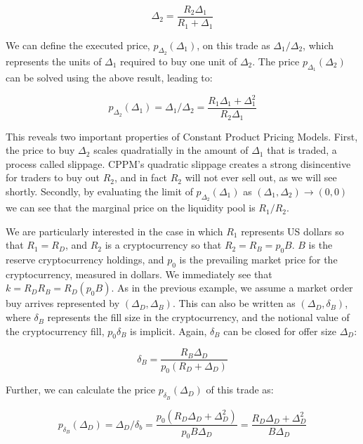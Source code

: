 \documentclass{article}
\begin{document}
\begin{equation}
\label{eq:cspm_sol}
\Delta_2 = \frac{R_2 \Delta_1}{R_1 + \Delta_1}
\end{equation}

We can define the executed price, $p_{\Delta_2}(\Delta_1)$, on this trade as $\Delta_1 / \Delta_2$, which represents the units of $\Delta_1$ required to buy one unit of $\Delta_2$. The price $p_{\Delta_1}(\Delta_2)$ can be solved using the above result, leading to:

\begin{equation}
\label{eq:cspm_price}
p_{\Delta_2}(\Delta_1) = \Delta_1 / \Delta_2 = \frac{R_1 \Delta_1 + \Delta_1^{2}}{R_2 \Delta_1}
\end{equation}

This reveals two important properties of Constant Product Pricing Models. First, the price to buy $\Delta_2$ scales quadratially in the amount of $\Delta_1$ that is traded, a process called slippage. CPPM's quadratic slippage creates a strong disincentive for traders to buy out $R_2$, and in fact $R_2$ will not ever sell out, as we will see shortly. Secondly, by evaluating the limit of $p_{\Delta_2}(\Delta_1)$ as $(\Delta_1, \Delta_2) \rightarrow (0, 0)$ we can see that the marginal price on the liquidity pool is $R_1 / R_2$.

We are particularly interested in the case in which $R_1$ represents US dollars so that $R_1 = R_D$, and $R_2$ is a cryptocurrency so that $R_2 = R_B = p_{0} B$. $B$ is the reserve cryptocurrency holdings, and $p_{0}$ is the prevailing market price for the cryptocurrency, measured in dollars. We immediately see that $k = R_D R_B = R_D (p_0 B)$. As in the previous example, we assume a market order buy arrives represented by $(\Delta_D, \Delta_B)$. This can also be written as $(\Delta_D, \delta_B)$, where $\delta_B$ represents the fill size in the cryptocurrency, and the notional value of the cryptocurrency fill, $p_0 \delta_B$ is implicit. Again, $\delta_B$ can be closed for offer size $\Delta_D$:

\begin{equation}
\label{eq:cspm_sol}
\delta_B = \frac{R_B \Delta_D}{p_0 ( R_D + \Delta_D )}
\end{equation}

Further, we can calculate the price $p_{\delta_B}(\Delta_D)$ of this trade as:

\begin{equation}
\label{eq:cspm_sol}
p_{\delta_B}(\Delta_D) = \Delta_D / \delta_b = \frac{p_0 (R_D \Delta_D + \Delta_D^2)}{p_0 B \Delta_D} = \frac{R_D \Delta_D + \Delta_D^2}{B \Delta_D}
\end{equation}
\end{document}
